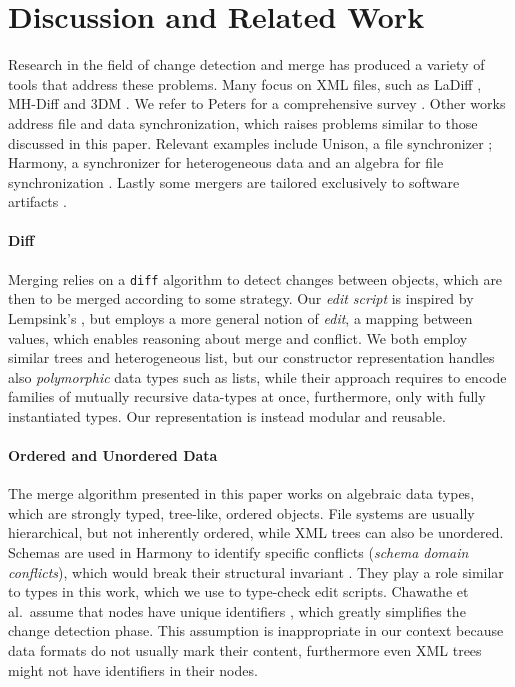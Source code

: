 \documentclass{sigplanconf}
\theoremstyle{plain}
\begin{document}
\section{Discussion and Related Work}
\label{sec:related-work}
Research in the field of change detection and merge has produced a
variety of tools that address these problems.  Many focus on XML
files, such as LaDiff \cite{Chawathe96}, MH-Diff \cite{Chawathe97} and
3DM \cite{Lind04, Lind05}.  We refer to Peters for a
comprehensive survey \cite{PetersSurvey}.
%
Other works address file and data synchronization, which raises
problems similar to those discussed in this paper. Relevant examples
include Unison, a file synchronizer \cite{Pierce98, UnisonSpec};
Harmony, a synchronizer for heterogeneous data
\cite{HarmonyOverview,Pierce07} and an algebra for file
synchronization \cite{Ramsey01}.
%
Lastly some mergers are tailored exclusively to software artifacts
\cite{Westfechtel91, Mens02, Apel11}. 

\paragraph{Diff}
Merging relies on a \texttt{diff} algorithm to detect changes between
objects, which are then to be merged according to some strategy.
%
Our \emph{edit script} is inspired by Lempsink's \cite{Lemp09}, but
employs a more general notion of \emph{edit}, a mapping between
values, which enables reasoning about merge and conflict.
%
%
We both employ similar trees and heterogeneous list, but our
constructor representation handles also \emph{polymorphic}
data types such as lists, while their approach requires 
to encode families of mutually recursive data-types
at once, furthermore, only with fully instantiated types.
Our representation is instead modular and reusable.

\paragraph{Ordered and Unordered Data} 
The merge algorithm presented in this paper works on algebraic data
types, which are strongly typed, tree-like, ordered objects. File
systems are usually hierarchical, but not inherently ordered, while
XML trees can also be unordered.
%
Schemas are used in Harmony to identify specific
conflicts (\emph{schema domain conflicts}), which would break their
structural invariant \cite{Pierce07}.
%
They play a role similar to types in this work, which we use to
type-check edit scripts.
%
Chawathe et al.\ assume that nodes have unique identifiers
\cite{Chawathe96}, which greatly simplifies the change detection
phase.
%
This assumption is inappropriate in our context because data formats
do not usually mark their content, furthermore even XML trees
might not have identifiers in their nodes.
	
\end{document}
